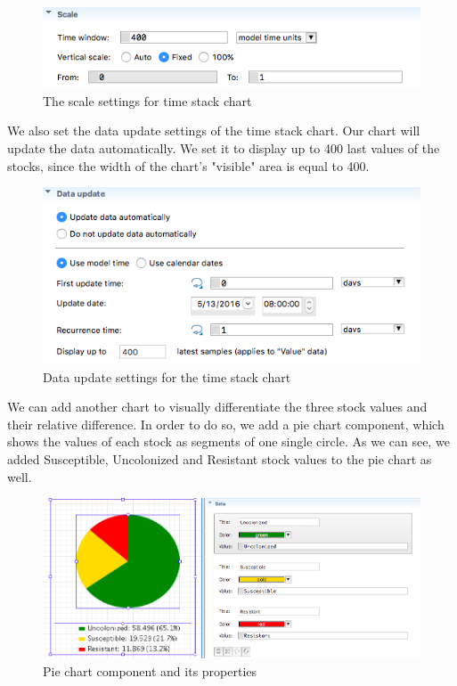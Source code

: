 \begin{figure}[H]
  \centering
  \includegraphics[height=0.2\textwidth]{img/screens/charts/charts3}
  \caption{The scale settings for time stack chart}
\end{figure}

We also set the data update settings of the time stack chart. Our chart will update the data automatically. We set it to display up to 400 last values of the stocks, since the width of the chart's "visible" area is equal to 400.

\begin{figure}[H]
  \centering
  \includegraphics[height=0.3\textwidth]{img/screens/charts/charts4}
  \caption{Data update settings for the time stack chart}
\end{figure}

We can add another chart to visually differentiate the three stock values and their relative difference. In order to do so, we add a pie chart component, which shows the values of each stock as segments of one single circle. As we can see, we added Susceptible, Uncolonized and Resistant stock values to the pie chart as well.

\begin{figure}[H]
  \centering
  \includegraphics[width=\textwidth]{img/screens/charts/charts7}
  \caption{Pie chart component and its properties}
\end{figure}

